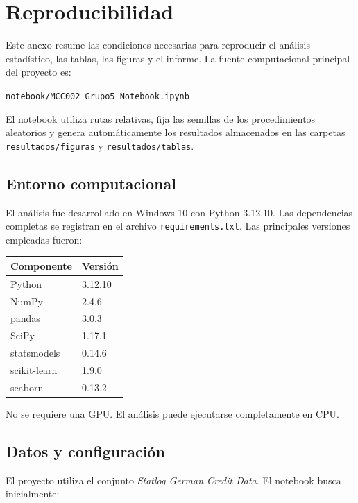 \section{Reproducibilidad}
\label{anexo:reproducibilidad}

Este anexo resume las condiciones necesarias para reproducir el análisis
estadístico, las tablas, las figuras y el informe. La fuente computacional
principal del proyecto es:

\begin{center}
    \texttt{notebook/MCC002\_Grupo5\_Notebook.ipynb}
\end{center}

El notebook utiliza rutas relativas, fija las semillas de los procedimientos
aleatorios y genera automáticamente los resultados almacenados en las
carpetas \texttt{resultados/figuras} y \texttt{resultados/tablas}.

\subsection{Entorno computacional}

El análisis fue desarrollado en Windows 10 con Python 3.12.10. Las
dependencias completas se registran en el archivo
\texttt{requirements.txt}. Las principales versiones empleadas fueron:

\begin{center}
\begin{tabular}{ll}
\toprule
Componente & Versión \\
\midrule
Python & 3.12.10 \\
NumPy & 2.4.6 \\
pandas & 3.0.3 \\
SciPy & 1.17.1 \\
statsmodels & 0.14.6 \\
scikit-learn & 1.9.0 \\
seaborn & 0.13.2 \\
\bottomrule
\end{tabular}
\end{center}

No se requiere una GPU. El análisis puede ejecutarse completamente en CPU.

\subsection{Datos y configuración}

El proyecto utiliza el conjunto
\textit{Statlog German Credit Data}. El notebook busca inicialmente:

